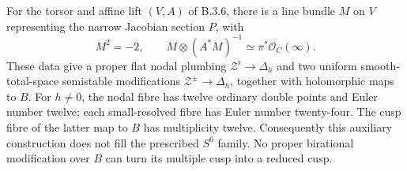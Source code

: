 \begin{proposition}\label{push:src:B.3.7}\label{push:B37}
For the torsor and affine lift $(V,A)$
of B.3.6, there is a line bundle $M$ on
$V$ representing the narrow Jacobian
section $P$, with
\[
 M^2=-2,\qquad
 M\otimes(A^*M)^{-1}
       \simeq\pi^*\mathcal O_C(\infty).
\]
These data give a proper flat nodal
plumbing $\mathcal Z^\flat\to\Delta_h$
and two uniform smooth-total-space
semistable modifications
$\mathcal Z^\pm\to\Delta_h$, together
with holomorphic maps to $B$.
For $h\ne0$, the nodal fibre has
twelve ordinary double points and
Euler number twelve; each small-resolved
fibre has Euler number twenty-four.
The cusp fibre of the latter map to
$B$ has multiplicity twelve.
Consequently this auxiliary construction
does not fill the prescribed $S^6$
family. No proper birational modification
over $B$ can turn its multiple cusp
into a reduced cusp.
\end{proposition}
